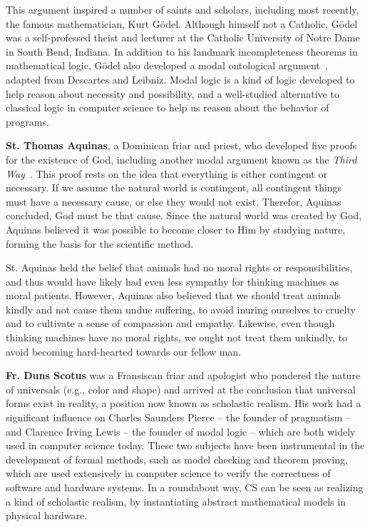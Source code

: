 \documentclass[sigplan,nonacm]{acmart}\settopmatter{printfolios=false,printccs=false,printacmref=false}
\begin{document}
  This argument inspired a number of saints and scholars, including most recently, the famous mathematician, Kurt G\"odel. Although himself not a Catholic, G\"odel was a self-professed theist and lecturer at the Catholic University of Notre Dame in South Bend, Indiana. In addition to his landmark incompleteness theorems in mathematical logic, G\"odel also developed a modal ontological argument~\cite{wang1997logical}, adapted from Descartes and Leibniz. Modal logic is a kind of logic developed to help reason about necessity and possibility, and a well-studied alternative to classical logic in computer science to help us reason about the behavior of programs.

  \textbf{St. Thomas Aquinas}, a Dominican friar and priest, who developed five proofs for the existence of God, including another modal argument known as the \textit{Third Way}~\cite{aquinas2008summa}. This proof rests on the idea that everything is either contingent or necessary. If we assume the natural world is contingent, all contingent things must have a necessary cause, or else they would not exist. Therefor, Aquinas concluded, God must be that cause. Since the natural world was created by God, Aquinas believed it was possible to become closer to Him by studying nature, forming the basis for the scientific method.

  St. Aquinas held the belief that animals had no moral rights or responsibilities, and thus would have likely had even less sympathy for thinking machines as moral patients. However, Aquinas also believed that we should treat animals kindly and not cause them undue suffering, to avoid inuring ourselves to cruelty and to cultivate a sense of compassion and empathy. Likewise, even though thinking machines have no moral rights, we ought not treat them unkindly, to avoid becoming hard-hearted towards our fellow man.

  \textbf{Fr. Duns Scotus} was a Fransiscan friar and apologist who pondered the nature of universals (e.g., color and shape) and arrived at the conclusion that universal forms exist in reality, a position now known as scholastic realism. His work had a significant influence on Charles Saunders Pierce -- the founder of pragmatism -- and Clarence Irving Lewis -- the founder of modal logic -- which are both widely used in computer science today. These two subjects have been instrumental in the development of formal methods, such as model checking and theorem proving, which are used extensively in computer science to verify the correctness of software and hardware systems. In a roundabout way, CS can be seen as realizing a kind of scholastic realism, by instantiating abstract mathematical models in physical hardware.
\end{document}
